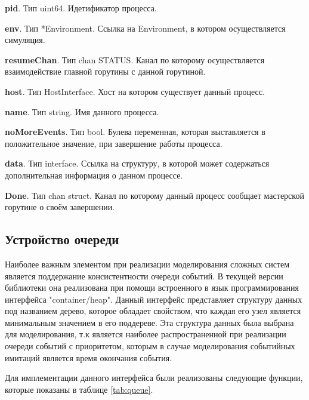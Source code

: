 \textbf{	pid}. Тип uint64. Идетификатор процесса. 

\textbf{	env}. Тип        *Environment. Ссылка на Environment, в котором осуществляется симуляция. 

\textbf{	resumeChan}. Тип chan STATUS. Канал по которому осуществляется взаимодействие главной горутины с данной горутиной. 

\textbf{	host}. Тип       HostInterface. Хост на котором существует данный процесс. 

\textbf{	name}. Тип         string. Имя данного процесса. 

\textbf{	noMoreEvents}. Тип bool. Булева переменная, которая выставляется в положительное значение, при завершение работы процесса.

\textbf{	data}. Тип         interface. Ссылка на  структуру, в  которой может содержаться дополнительная информация о данном процессе.

\textbf{	Done}. Тип chan struct. Канал по которому данный процесс сообщает мастерской горутине о своём завершении. 



\subsection{Устройство очереди}

Наиболее важным элементом при реализации моделирования сложных систем является поддержание консистентности очереди событий. В текущей версии библиотеки она реализована при помощи встроенного в язык программирования интерфейса "container/heap". Данный интерфейс представляет структуру данных под названием дерево, которое обладает свойством, что каждая его узел является минимальным значением в его поддереве. Эта структура данных была выбрана для моделирования, т.к является наиболее распространенной при реализации очереди событий с приоритетом, которым в случае моделирования событийных имитаций является время окончания события. 

Для имплементации данного интерфейса были реализованы следующие функции, которые показаны в таблице \ref{tab:queue}. 

